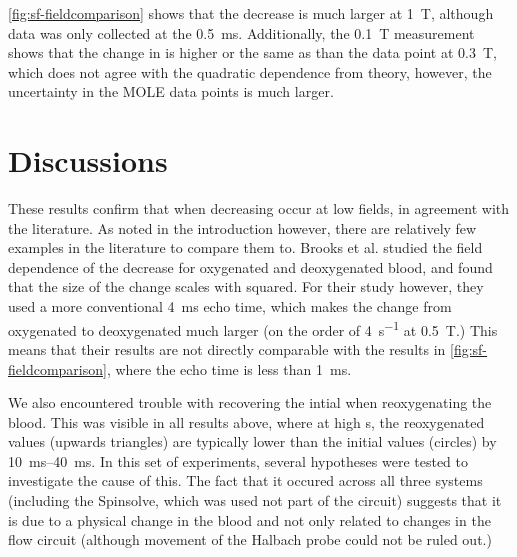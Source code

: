 \autoref{fig:sf-fieldcomparison} shows that the \Ttwo decrease is much larger at \SI{1}{T}, although data was only collected at the \SI{0.5}{ms}.
Additionally, the \SI{0.1}{\tesla} measurement shows that the change in \Rtwo is higher or the same as than the data point at \SI{0.3}{T}, which does not agree with the quadratic dependence from theory, however, the uncertainty in the MOLE data points is much larger.


\section{Discussions}

These results confirm that \Ttwo when decreasing \SOtwo occur at low fields, in agreement with the literature.
As noted in the introduction however, there are relatively few examples in the literature to compare them to.
Brooks et al. studied the field dependence of the \Ttwo decrease for oxygenated and deoxygenated blood, and found that the size of the \Rtwo change scales with \Bzero  squared\cite[Fig.1]{BrooksComparisont2relaxation1995}.
For their study however, they used a more conventional \SI{4}{ms} echo time, which makes the \Rtwo change from oxygenated to deoxygenated much larger (on the order of \SI{4}{s^{-1}} at \SI{0.5}{T}.)
This means that their results are not directly comparable with the results in \autoref{fig:sf-fieldcomparison}, where the echo time is less than \SI{1}{ms}.

We also encountered trouble with recovering the intial \Ttwo when reoxygenating the blood.
This was visible in all results above, where at high \SOtwo{}s, the reoxygenated \Ttwo values (upwards triangles)  are typically lower than the initial values (circles) by \SIrange{10}{40}{ms}.
In this set of experiments, several hypotheses were tested to investigate the cause of this.
The fact that it occured across all three systems (including the Spinsolve, which was used not part of the circuit) suggests that it is due to a physical change in the blood and not only related to changes in the flow circuit (although movement of the Halbach probe could not be ruled out.)


